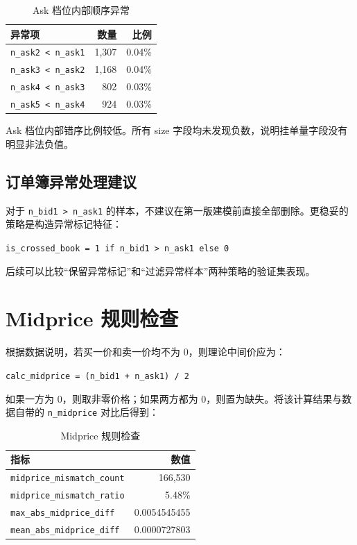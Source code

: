 \documentclass[UTF8,a4paper,12pt]{ctexart}
\begin{document}
\begin{table}[H]
\centering
\caption{Ask 档位内部顺序异常}
\begin{tabular}{lrr}
\toprule
异常项 & 数量 & 比例 \\
\midrule
\texttt{n\_ask2 < n\_ask1} & 1,307 & 0.04\% \\
\texttt{n\_ask3 < n\_ask2} & 1,168 & 0.04\% \\
\texttt{n\_ask4 < n\_ask3} & 802 & 0.03\% \\
\texttt{n\_ask5 < n\_ask4} & 924 & 0.03\% \\
\bottomrule
\end{tabular}
\end{table}

Ask 档位内部错序比例较低。所有 size 字段均未发现负数，说明挂单量字段没有明显非法负值。

\subsection{订单簿异常处理建议}

对于 \texttt{n\_bid1 > n\_ask1} 的样本，不建议在第一版建模前直接全部删除。更稳妥的策略是构造异常标记特征：

\begin{center}
\texttt{is\_crossed\_book = 1 if n\_bid1 > n\_ask1 else 0}
\end{center}

后续可以比较“保留异常标记”和“过滤异常样本”两种策略的验证集表现。

\section{Midprice 规则检查}

根据数据说明，若买一价和卖一价均不为 0，则理论中间价应为：

\begin{center}
\texttt{calc\_midprice = (n\_bid1 + n\_ask1) / 2}
\end{center}

如果一方为 0，则取非零价格；如果两方都为 0，则置为缺失。将该计算结果与数据自带的 \texttt{n\_midprice} 对比后得到：

\begin{table}[H]
\centering
\caption{Midprice 规则检查}
\begin{tabular}{lr}
\toprule
指标 & 数值 \\
\midrule
\texttt{midprice\_mismatch\_count} & 166,530 \\
\texttt{midprice\_mismatch\_ratio} & 5.48\% \\
\texttt{max\_abs\_midprice\_diff} & 0.0054545455 \\
\texttt{mean\_abs\_midprice\_diff} & 0.0000727803 \\
\bottomrule
\end{tabular}
\end{table}
\end{document}
